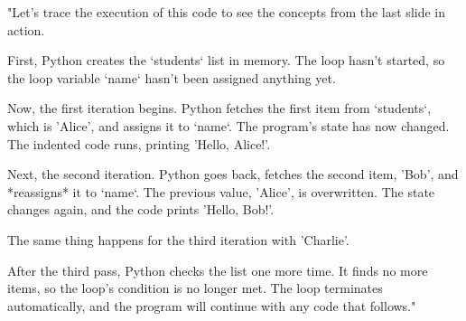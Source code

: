 \documentclass{beamer}
\begin{document}
\begin{frame}[fragile]
    \begin{note}
    "Let's trace the execution of this code to see the concepts from the last slide in action.

    First, Python creates the `students` list in memory. The loop hasn't started, so the loop variable `name` hasn't been assigned anything yet.

    Now, the first iteration begins. Python fetches the first item from `students`, which is 'Alice', and assigns it to `name`. The program's state has now changed. The indented code runs, printing 'Hello, Alice!'.

    Next, the second iteration. Python goes back, fetches the second item, 'Bob', and *reassigns* it to `name`. The previous value, 'Alice', is overwritten. The state changes again, and the code prints 'Hello, Bob!'.

    The same thing happens for the third iteration with 'Charlie'.

    After the third pass, Python checks the list one more time. It finds no more items, so the loop's condition is no longer met. The loop terminates automatically, and the program will continue with any code that follows."
    \end{note}
\end{frame}
\end{document}
